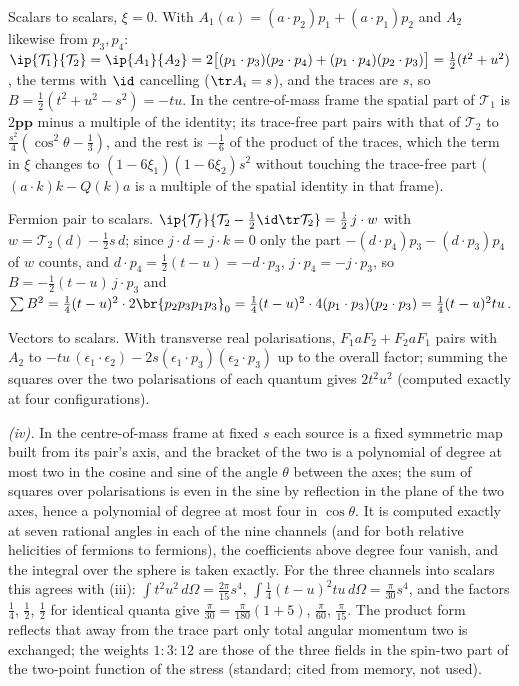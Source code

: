Scalars to scalars, $\xi = 0$. With $A_{1}(a) = (a \cdot p_{2})p_{1} + (a \cdot p_{1})p_{2}$ and $A_{2}$ likewise from $p_{3}, p_{4}$: $\ip{\mathcal{T}_{1}}{\mathcal{T}_{2}} = \ip{A_{1}}{A_{2}} = 2\bigl[(p_{1} \cdot p_{3})(p_{2} \cdot p_{4}) + (p_{1} \cdot p_{4})(p_{2} \cdot p_{3})\bigr] = \tfrac12(t^{2} + u^{2})$, the terms with $\id$ cancelling ($\tr A_{i} = s$), and the traces are $s$, so $B = \tfrac12(t^{2} + u^{2} - s^{2}) = -tu$. In the centre-of-mass frame the spatial part of $\mathcal{T}_{1}$ is $2\mathbf{p}\mathbf{p}$ minus a multiple of the identity; its trace-free part pairs with that of $\mathcal{T}_{2}$ to $\tfrac{s^{2}}{4}(\cos^{2}\theta - \tfrac13)$, and the rest is $-\tfrac16$ of the product of the traces, which the term in $\xi$ changes to $(1 - 6\xi_{1})(1 - 6\xi_{2})s^{2}$ without touching the trace-free part ($(a \cdot k)k - Q(k)a$ is a multiple of the spatial identity in that frame).

Fermion pair to scalars. $\ip{\mathcal{T}_{f}}{\mathcal{T}_{2} - \tfrac12\id\tr\mathcal{T}_{2}} = \tfrac12\,j \cdot w$ with $w = \mathcal{T}_{2}(d) - \tfrac12 s\,d$; since $j \cdot d = j \cdot k = 0$ only the part $-(d \cdot p_{4})p_{3} - (d \cdot p_{3})p_{4}$ of $w$ counts, and $d \cdot p_{4} = \tfrac12(t - u) = -d \cdot p_{3}$, $j \cdot p_{4} = -j \cdot p_{3}$, so $B = -\tfrac12(t - u)\,j \cdot p_{3}$ and $\sum B^{2} = \tfrac14(t - u)^{2}\cdot 2\br{p_{2}p_{3}p_{1}p_{3}}_{0} = \tfrac14(t - u)^{2}\cdot 4(p_{1} \cdot p_{3})(p_{2} \cdot p_{3}) = \tfrac14(t - u)^{2}tu$.

Vectors to scalars. With transverse real polarisations, $F_{1}aF_{2} + F_{2}aF_{1}$ pairs with $A_{2}$ to $-tu\,(\epsilon_{1} \cdot \epsilon_{2}) - 2s(\epsilon_{1} \cdot p_{3})(\epsilon_{2} \cdot p_{3})$ up to the overall factor; summing the squares over the two polarisations of each quantum gives $2t^{2}u^{2}$ (computed exactly at four configurations).

\emph{(iv).} In the centre-of-mass frame at fixed $s$ each source is a fixed symmetric map built from its pair's axis, and the bracket of the two is a polynomial of degree at most two in the cosine and sine of the angle $\theta$ between the axes; the sum of squares over polarisations is even in the sine by reflection in the plane of the two axes, hence a polynomial of degree at most four in $\cos\theta$. It is computed exactly at seven rational angles in each of the nine channels (and for both relative helicities of fermions to fermions), the coefficients above degree four vanish, and the integral over the sphere is taken exactly. For the three channels into scalars this agrees with (iii): $\int t^{2}u^{2}\,d\Omega = \tfrac{2\pi}{15}s^{4}$, $\int\tfrac14(t - u)^{2}tu\,d\Omega = \tfrac{\pi}{30}s^{4}$, and the factors $\tfrac14$, $\tfrac12$, $\tfrac12$ for identical quanta give $\tfrac{\pi}{30} = \tfrac{\pi}{180}(1 + 5)$, $\tfrac{\pi}{60}$, $\tfrac{\pi}{15}$. The product form reflects that away from the trace part only total angular momentum two is exchanged; the weights $1 : 3 : 12$ are those of the three fields in the spin-two part of the two-point function of the stress (standard; cited from memory, not used).

